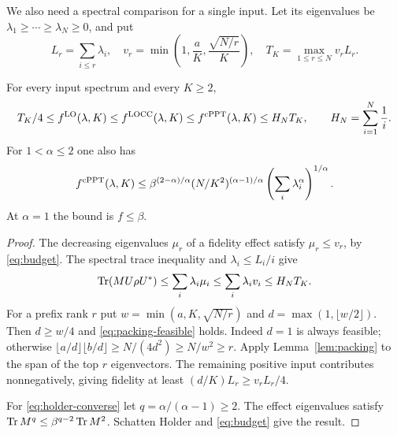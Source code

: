 We also need a spectral comparison for a single input. Let its eigenvalues be $\lambda_1\ge\cdots\ge\lambda_N\ge0$, and put
\begin{equation}\label{eq:envelope}
 L_r=\sum_{i\le r}\lambda_i,\quad
 v_r=\min\left(1,\frac aK,\frac{\sqrt{N/r}}K\right),\quad
 T_K=\max_{1\le r\le N}v_rL_r.
\end{equation}

\begin{theorem}\label{thm:envelope}
For every input spectrum and every $K\ge2$,
\begin{equation}\label{eq:envelope-bound}
 T_K/4\le f^{\mathrm{LO}}(\lambda,K)\le f^{\mathrm{LOCC}}(\lambda,K)
 \le f^{\mathrm{cPPT}}(\lambda,K)\le H_NT_K,
 \qquad H_N=\sum_{i=1}^N\frac1i.
\end{equation}
For $1<\alpha\le2$ one also has
\begin{equation}\label{eq:holder-converse}
 f^{\mathrm{cPPT}}(\lambda,K)
 \le\beta^{(2-\alpha)/\alpha}(N/K^2)^{(\alpha-1)/\alpha}
 \left(\sum_i\lambda_i^\alpha\right)^{1/\alpha}.
\end{equation}
At $\alpha=1$ the bound is $f\le\beta$.
\end{theorem}
\begin{proof}
The decreasing eigenvalues $\mu_r$ of a fidelity effect satisfy $\mu_r\le v_r$, by \eqref{eq:budget}. The spectral trace inequality and $\lambda_i\le L_i/i$ give
\[
 \operatorname{Tr}(MU\rho U^*)\le\sum_i\lambda_i\mu_i
 \le\sum_i\lambda_iv_i\le H_NT_K.
\]
For a prefix rank $r$ put $w=\min(a,K,\sqrt{N/r})$ and $d=\max(1,\lfloor w/2\rfloor)$. Then $d\ge w/4$ and \eqref{eq:packing-feasible} holds. Indeed $d=1$ is always feasible; otherwise $\lfloor a/d\rfloor\lfloor b/d\rfloor\ge N/(4d^2)\ge N/w^2\ge r$. Apply Lemma~\ref{lem:packing} to the span of the top $r$ eigenvectors. The remaining positive input contributes nonnegatively, giving fidelity at least $(d/K)L_r\ge v_rL_r/4$.

For \eqref{eq:holder-converse} let $q=\alpha/(\alpha-1)\ge2$. The effect eigenvalues satisfy $\operatorname{Tr} M^q\le\beta^{q-2}\operatorname{Tr} M^2$. Schatten Holder and \eqref{eq:budget} give the result.
\end{proof}
